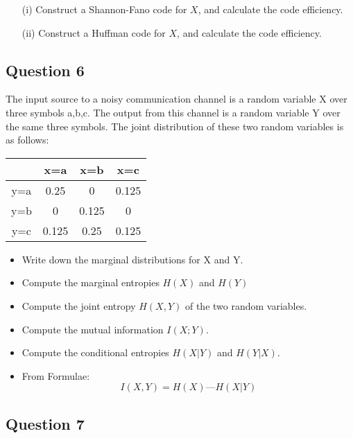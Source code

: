 \begin{itemize}
\item[(i)] Construct a Shannon-Fano code for $X$, and calculate the code efficiency.
\item[(ii)] Construct a Huffman code for $X$, and calculate the code efficiency.
\end{itemize}


\subsection*{Question 6}

The input source to a noisy communication channel is a random variable X over three symbols a,b,c. The output from this channel is a random variable Y over the same three symbols. The joint distribution of these two random variables is as follows:


\begin{center}
\begin{tabular}{|c|c|c|c|}
\hline	 &x=a	&x=b&	     x=c\\ \hline
y=a	 &0.25	&0	 &    0.125 \\ \hline
y=b	 &0	    &0.125&	 0 \\ \hline
y=c	 &0.125&	0.25&	 0.125 \\ \hline
\end{tabular} 
\end{center}

\begin{itemize}
\item Write down the marginal distributions for X and Y. %
\item Compute the marginal entropies $H(X)$ and $H(Y)$ %
\item Compute the joint entropy $H(X,Y)$ of the two random variables. %
\item
Compute the mutual information $I(X;Y)$.
\item 
Compute the conditional entropies $H(X|Y)$ and $H(Y|X)$.
\item 
From Formulae: \[I(X,Y) = H(X) — H(X|Y)\]
\end{itemize}
\subsection*{Question 7}

